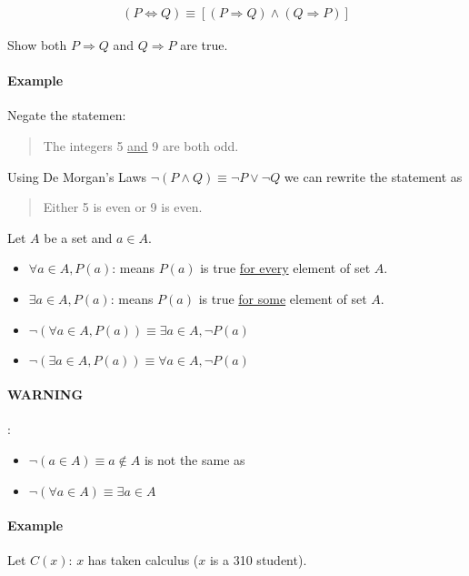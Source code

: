 \documentclass[../main.tex]{subfiles}
\begin{document}
\begin{align*}
    (P \Leftrightarrow Q) \equiv [ (P \Rightarrow Q) \land (Q \Rightarrow P) ]
\end{align*}

Show both $P \Rightarrow Q$ and $Q \Rightarrow P$ are true.

\paragraph{Example}

Negate the statemen:

\begin{quote}
    The integers 5 \underline{and} 9 are both odd.
\end{quote}

Using De Morgan's Laws $\neg(P \land Q) \equiv \neg P \lor \neg Q$ we can rewrite the statement as

\begin{quote}
    Either 5 is even or 9 is even.
\end{quote}

Let $A$ be a set and $a \in A$.

\begin{itemize}
    \item $\forall a \in A, P(a)$: means $P(a)$ is true \underline{for every} element of set $A$.
    \item $\exists a \in A, P(a)$: means $P(a)$ is true \underline{for some} element of set $A$.
    \item $\neg (\forall a \in A, P(a)) \equiv \exists a \in A, \neg P(a)$
    \item $\neg (\exists a \in A, P(a)) \equiv \forall a \in A, \neg P(a)$
\end{itemize}

\paragraph{WARNING}:

\begin{itemize}
    \item $\neg (a \in A) \equiv a \notin A$ is not the same as
    \item $\neg (\forall a \in A) \equiv \exists a \in A$
\end{itemize}

\paragraph{Example}
Let $C(x)$: $x$ has taken calculus ($x$ is a 310 student).
\end{document}
